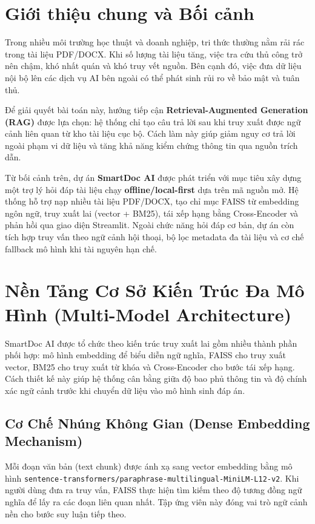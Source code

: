 \documentclass[10pt, conference, a4paper, compsocconf]{IEEEtran}
\begin{document}
\section{Giới thiệu chung và Bối cảnh}
Trong nhiều môi trường học thuật và doanh nghiệp, tri thức thường nằm rải rác trong tài liệu PDF/DOCX. Khi số lượng tài liệu tăng, việc tra cứu thủ công trở nên chậm, khó nhất quán và khó truy vết nguồn. Bên cạnh đó, việc đưa dữ liệu nội bộ lên các dịch vụ AI bên ngoài có thể phát sinh rủi ro về bảo mật và tuân thủ.

Để giải quyết bài toán này, hướng tiếp cận \textbf{Retrieval-Augmented Generation (RAG)} được lựa chọn: hệ thống chỉ tạo câu trả lời sau khi truy xuất được ngữ cảnh liên quan từ kho tài liệu cục bộ. Cách làm này giúp giảm nguy cơ trả lời ngoài phạm vi dữ liệu và tăng khả năng kiểm chứng thông tin qua nguồn trích dẫn.

Từ bối cảnh trên, dự án \textbf{SmartDoc AI} được phát triển với mục tiêu xây dựng một trợ lý hỏi đáp tài liệu chạy \textbf{offline/local-first} dựa trên mã nguồn mở. Hệ thống hỗ trợ nạp nhiều tài liệu PDF/DOCX, tạo chỉ mục FAISS từ embedding ngôn ngữ, truy xuất lai (vector + BM25), tái xếp hạng bằng Cross-Encoder và phản hồi qua giao diện Streamlit. Ngoài chức năng hỏi đáp cơ bản, dự án còn tích hợp truy vấn theo ngữ cảnh hội thoại, bộ lọc metadata đa tài liệu và cơ chế fallback mô hình khi tài nguyên hạn chế.

\section{Nền Tảng Cơ Sở Kiến Trúc Đa Mô Hình (Multi-Model Architecture)}

SmartDoc AI được tổ chức theo kiến trúc truy xuất lai gồm nhiều thành phần phối hợp: mô hình embedding để biểu diễn ngữ nghĩa, FAISS cho truy xuất vector, BM25 cho truy xuất từ khóa và Cross-Encoder cho bước tái xếp hạng. Cách thiết kế này giúp hệ thống cân bằng giữa độ bao phủ thông tin và độ chính xác ngữ cảnh trước khi chuyển dữ liệu vào mô hình sinh đáp án.

\subsection{Cơ Chế Nhúng Không Gian (Dense Embedding Mechanism)}
Mỗi đoạn văn bản (text chunk) được ánh xạ sang vector embedding bằng mô hình \texttt{sentence-transformers/paraphrase-multilingual-MiniLM-L12-v2}. Khi người dùng đưa ra truy vấn, FAISS thực hiện tìm kiếm theo độ tương đồng ngữ nghĩa để lấy ra các đoạn liên quan nhất. Tập ứng viên này đóng vai trò ngữ cảnh nền cho bước suy luận tiếp theo.
\end{document}
